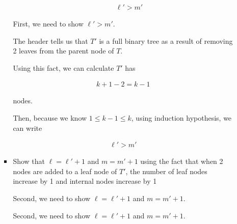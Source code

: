 \documentclass[12pt]{article}
\begin{document}
\begin{itemize}
\begin{mdframed}
\begin{enumerate}[1.]
\begin{itemize}
\begin{itemize}
\begin{mdframed}
                    \begin{align}
                        \ell' > m'
                    \end{align}

                    \end{mdframed}
                \end{itemize}

                \bigskip

                \begin{mdframed}
                First, we need to show $\ell' > m'$.

                \bigskip

                The header tells us that $T'$ is a full binary tree as a result
                of removing 2 leaves from the parent node of $T$.

                \bigskip

                Using this fact, we can calculate $T'$ has

                \begin{align}
                    k+1-2 = k-1
                \end{align}

                nodes.

                \bigskip

                Then, because we know $1 \leq k-1 \leq k$, using induction hypothesis,
                we can write

                \begin{align}
                    \ell' > m'
                \end{align}

                \end{mdframed}

                \item Show that $\ell = \ell' + 1$ and $m = m' + 1$ using the fact that
                when 2 nodes are added to a leaf node of $T'$, the number of leaf
                nodes increase by 1 and internal nodes increase by 1

                \bigskip

                Second, we need to show $\ell = \ell' + 1$ and $m = m' + 1$.

                \bigskip

                \begin{mdframed}

                Second, we need to show $\ell = \ell' + 1$ and $m = m' + 1$.


\end{mdframed}
\end{itemize}
\end{enumerate}
\end{mdframed}
\end{itemize}
\end{document}
